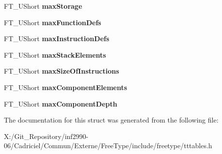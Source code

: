 \begin{DoxyCompactItemize}
\item 
\hypertarget{struct_t_t___max_profile___a502a8579e3d358f3c00776ed0cc8a168}{F\-T\-\_\-\-U\-Short {\bfseries max\-Storage}}\label{struct_t_t___max_profile___a502a8579e3d358f3c00776ed0cc8a168}

\item 
\hypertarget{struct_t_t___max_profile___acc24e822a62bbfaa86d36f691fcde60b}{F\-T\-\_\-\-U\-Short {\bfseries max\-Function\-Defs}}\label{struct_t_t___max_profile___acc24e822a62bbfaa86d36f691fcde60b}

\item 
\hypertarget{struct_t_t___max_profile___a3f7bd433baede417293415cf60f20d8f}{F\-T\-\_\-\-U\-Short {\bfseries max\-Instruction\-Defs}}\label{struct_t_t___max_profile___a3f7bd433baede417293415cf60f20d8f}

\item 
\hypertarget{struct_t_t___max_profile___a2df9b9ff2a5a9daaa7c3d40fe024637f}{F\-T\-\_\-\-U\-Short {\bfseries max\-Stack\-Elements}}\label{struct_t_t___max_profile___a2df9b9ff2a5a9daaa7c3d40fe024637f}

\item 
\hypertarget{struct_t_t___max_profile___ac458411198b09d303ec8ae206e6926b6}{F\-T\-\_\-\-U\-Short {\bfseries max\-Size\-Of\-Instructions}}\label{struct_t_t___max_profile___ac458411198b09d303ec8ae206e6926b6}

\item 
\hypertarget{struct_t_t___max_profile___a110e6d735610c6d8fd89221d03440c32}{F\-T\-\_\-\-U\-Short {\bfseries max\-Component\-Elements}}\label{struct_t_t___max_profile___a110e6d735610c6d8fd89221d03440c32}

\item 
\hypertarget{struct_t_t___max_profile___a9ae1f117c954e0711b03f1675d6191d9}{F\-T\-\_\-\-U\-Short {\bfseries max\-Component\-Depth}}\label{struct_t_t___max_profile___a9ae1f117c954e0711b03f1675d6191d9}

\end{DoxyCompactItemize}


The documentation for this struct was generated from the following file\-:\begin{DoxyCompactItemize}
\item 
X\-:/\-Git\-\_\-\-Repository/inf2990-\/06/\-Cadriciel/\-Commun/\-Externe/\-Free\-Type/include/freetype/tttables.\-h\end{DoxyCompactItemize}
